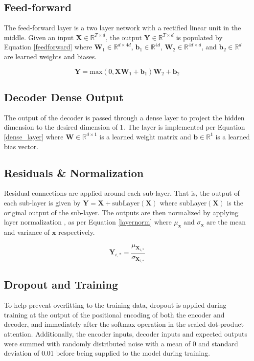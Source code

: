 \documentclass[conference]{IEEEtran}
\begin{document}
\subsection{Feed-forward}
The feed-forward layer is a two layer network with a rectified linear unit in the middle.
Given an input $\boldsymbol{X} \in \mathbb{R}^{T \times d}$, the output $\boldsymbol{Y} \in \mathbb{R}^{T \times d}$ is populated by Equation \ref{feedforward} where $\boldsymbol{W}_1 \in \mathbb{R}^{d \times 4d}$, $\boldsymbol{b}_1 \in \mathbb{R}^{4d}$, $\boldsymbol{W}_2 \in \mathbb{R}^{4d \times d}$, and $\boldsymbol{b}_2 \in \mathbb{R}^{d}$ are learned weights and biases.

\begin{equation} \label{feedforward}
\boldsymbol{Y} = \text{max}(0, \boldsymbol{X}  \boldsymbol{W}_1 + \boldsymbol{b}_1)  \boldsymbol{W}_2 + \boldsymbol{b}_2
\end{equation}

\subsection{Decoder Dense Output}
The output of the decoder is passed through a dense layer to project the hidden dimension to the desired dimension of 1.
The layer is implemented per Equation \ref{dense_layer} where $\boldsymbol{W} \in \mathbb{R}^{d \times 1}$ is a learned weight matrix and $\boldsymbol{b} \in \mathbb{R}^{1}$ is a learned bias vector.



\subsection{Residuals \& Normalization}
Residual connections \cite{He2015} are applied around each sub-layer.
That is, the output of each sub-layer is given by $\boldsymbol{Y} = \boldsymbol{X} + \text{subLayer}(\boldsymbol{X})$ where subLayer$(\boldsymbol{X})$ is the original output of the sub-layer.
The outputs are then normalized by applying layer normalization \cite{Ba2016}, as per Equation \ref{layernorm} where $\mu_{\boldsymbol{x}}$ and $\sigma_{\boldsymbol{x}}$ are the mean and variance of $\boldsymbol{x}$ respectively.

\begin{equation} \label{layernorm}
\boldsymbol{Y}_{i,*} = \frac{\mu_{\boldsymbol{X}_{i,*}}}{\sigma_{\boldsymbol{X}_{i,*}}}
\end{equation}

\subsection{Dropout and Training}
To help prevent overfitting to the training data, dropout \cite{srivastava14a} is applied during training at the output of the positional encoding of both the encoder and decoder, and immediately after the softmax operation in the scaled dot-product attention.
Additionally, the encoder inputs, decoder inputs and expected outputs were summed with randomly distributed noise with a mean of 0 and standard deviation of 0.01 before being supplied to the model during training.
\end{document}
